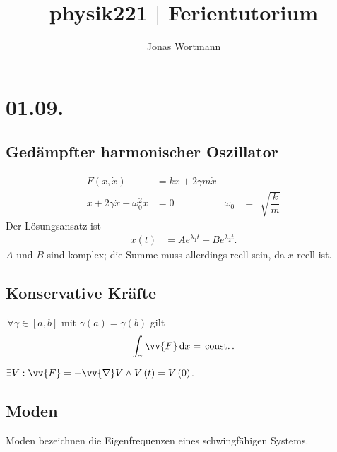 \documentclass[a4paper,12pt]{article}
\newcommand{\td}{\,\text{d}}
\numberwithin{equation}{section}
\begin{document}

\title{physik221 $|$ Ferientutorium}
\author{Jonas Wortmann}
\maketitle
{}


\newpage


\fancyhead[L]{\thepage}
\fancyfoot[C]{}

\tableofcontents


\newpage


\fancyhead[R]{\leftmark\\\rightmark}

\newpage
\section{01.09.}
\subsection{Gedämpfter harmonischer Oszillator}
\begin{align} 
        F\left(x,\dot{x}\right)&=kx+2\gamma m\dot{x}&&\\
        \ddot{x}+2\gamma \dot{x}+\omega _0^2x&=0&\omega _0&=\,\sqrt[]{\dfrac{k}{m}}
\end{align} 
Der Lösungsansatz ist
\begin{align} 
        x\left(t\right)&=Ae^{\lambda _1t}+Be^{\lambda _2t}
.\end{align} 
$A$ und $B$ sind komplex; die Summe muss allerdings reell sein, da $x$ reell ist.

\subsection{Konservative Kräfte}
$\,\forall \gamma  \in \left[a,b\right]$ mit $\gamma \left(a\right)=\gamma \left(b\right)$ gilt
\begin{align} 
        \int_{\gamma }^{}\vv{F}\td x=\,\text{const.}\,
.\end{align} 
$\exists V:\vv{F}=-\vv{\nabla }V\land V\left(t\right)=V\left(0\right)$.

\subsection{Moden}
Moden bezeichnen die Eigenfrequenzen eines schwingfähigen Systems.
\end{document}
